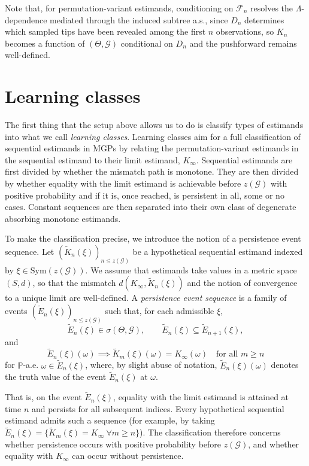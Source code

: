 \documentclass{article}
\begin{document}
Note that, for permutation-variant estimands, conditioning on $\mathcal{F}_n$ resolves the $\Lambda$-dependence mediated through the induced subtree a.s., since $D_n$ determines which sampled tips have been revealed among the first $n$ observations, so $K_n$ becomes a function of $(\Theta, \mathcal{G})$ conditional on $D_n$ and the pushforward remains well-defined.

\section{Learning classes}

The first thing that the setup above allows us to do is classify types of estimands into what we call \textit{learning classes}. Learning classes aim for a full classification of sequential estimands in MGPs by relating the permutation-variant estimands in the sequential estimand to their limit estimand, $K_\infty$. Sequential estimands are first divided by whether the mismatch path is monotone. They are then divided by whether equality with the limit estimand is achievable before $z(\mathcal{G})$ with positive probability and if it is, once reached, is persistent in all, some or no cases. Constant sequences are then separated into their own class of degenerate absorbing monotone estimands.

To make the classification precise, we introduce the notion of a persistence event sequence. Let $(\widetilde K_n(\xi))_{n \le z(\mathcal{G})}$ be a hypothetical sequential estimand indexed by $\xi \in \mathrm{Sym}(z(\mathcal{G}))$. We assume that estimands take values in a metric space $(S,d)$, so that the mismatch $d(K_\infty, \widetilde K_n(\xi))$ and the notion of convergence to a unique limit are well-defined. A \textit{persistence event sequence} is a family of events $(\widetilde E_n(\xi))_{n\le z(\mathcal G)}$ such that, for each admissible $\xi$,
\[
\widetilde E_n(\xi)\in \sigma(\Theta,\mathcal G),
\qquad
\widetilde E_n(\xi)\subseteq \widetilde E_{n+1}(\xi),
\]
and
\[
\widetilde E_n(\xi)(\omega)\implies\widetilde K_m(\xi)(\omega)=K_\infty(\omega)
\quad\text{for all }m\ge n
\]
for $\mathbb P$-a.e. $\omega\in \widetilde E_n(\xi)$, where, by slight abuse of notation, $\widetilde E_n(\xi)(\omega)$ denotes the truth value of the event $\widetilde E_n(\xi)$ at $\omega$.

That is, on the event $\widetilde E_n(\xi)$, equality with the limit estimand is attained at time $n$ and persists for all subsequent indices. Every hypothetical sequential estimand admits such a sequence (for example, by taking $\widetilde E_n(\xi) = \{\widetilde K_m(\xi)=K_\infty \ \forall m \ge n\}$). The classification therefore concerns whether persistence occurs with positive probability before $z(\mathcal{G})$, and whether equality with $K_\infty$ can occur without persistence.
\end{document}
